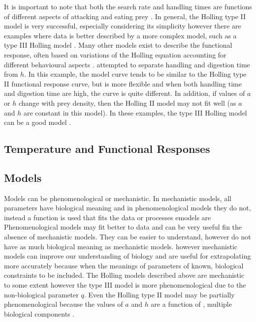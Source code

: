 \documentclass{article}
\begin{document}
It is important to note that both the search rate and handling times are functions of different aspects of attacking and eating prey \cite{Hassel1976TheDeath-Rate}. %
In general, the Holling type II model is very successful, especially considering its simplicity however there are examples where data is better described by a more complex model, such as a type III Holling model \cite{Hassel1976TheDeath-Rate} . 
Many other models exist to describe the functional response, often based on variations of the Holling equation accounting for different behavioural aspects  \cite{Jeschke2002PredatorPrey}. \cite{Jeschke2002PredatorPrey} attempted to separate handling and digestion time from  $h$. In this example, the model curve tends to be similar to the Holling type II functional response curve, but is more flexible and when both handling time and digestion time are high, the curve is quite different. 
In addition, if values of $a$ or $h$ change with prey density, then the Holling II model may not fit well  (as $a$ and $h$ are constant in this model). In these examples, the type III Holling model can be a good model \cite{Hassel1976TheDeath-Rate}. 
\subsection{Temperature and Functional Responses}

\subsection{Models}
Models can be phenomenological or mechanistic. In mechanistic models, all parameters have biological meaning and in phenomenological models they do not, instead a function is used that fits the data or processes %
emodels are  %
Phenomenological models may fit better to data and can be very useful fin the absence of mechanistic models. They can be easier to understand, however do not have as much biological meaning as mechanistic models. %
however mechanistic models can improve our understanding of biology and are useful for extrapolating more accurately because when the meanings of parameters of known, biological constraints to be included. %
The Holling models described above are mechanistic to some extent however the type III model is more phenomenological due to the non-biological parameter $q$. Even the Holling type II model may be partially phenomenological because the values of $a$ and $h$ are a function of , multiple biological components \cite{Hassel1976TheDeath-Rate}.%
\end{document}
